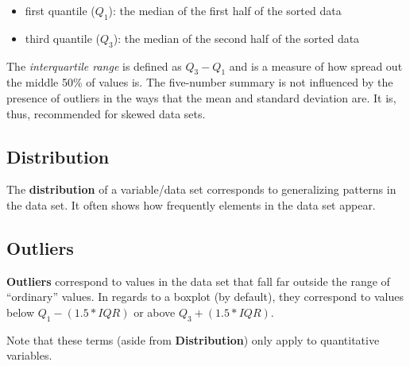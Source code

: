 \documentclass[]{tufte-book}
\providecommand{\tightlist}{%
  \setlength{\itemsep}{0pt}\setlength{\parskip}{0pt}}
\begin{document}
\begin{itemize}
\tightlist
\item
  first quantile (\(Q_1\)): the median of the first half of the sorted
  data
\item
  third quantile (\(Q_3\)): the median of the second half of the sorted
  data
\end{itemize}

The \emph{interquartile range} is defined as \(Q_3 - Q_1\) and is a
measure of how spread out the middle 50\% of values is. The five-number
summary is not influenced by the presence of outliers in the ways that
the mean and standard deviation are. It is, thus, recommended for skewed
data sets.

\subsection{Distribution}\label{distribution}

The \textbf{distribution} of a variable/data set corresponds to
generalizing patterns in the data set. It often shows how frequently
elements in the data set appear.

\subsection{Outliers}\label{outliers}

\textbf{Outliers} correspond to values in the data set that fall far
outside the range of ``ordinary'' values. In regards to a boxplot (by
default), they correspond to values below \(Q_1 - (1.5 * IQR)\) or above
\(Q_3 + (1.5 * IQR)\).

Note that these terms (aside from \textbf{Distribution}) only apply to
quantitative variables.


\end{document}
